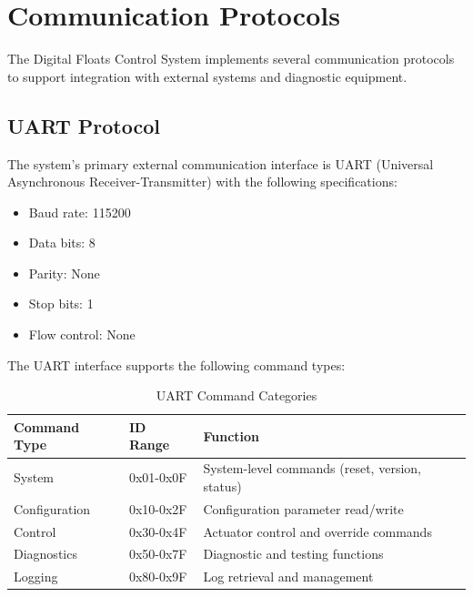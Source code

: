 \documentclass[12pt,a4paper,twoside,openright]{book}
\newcommand{\tabletextfont}{\normalfont\rmfamily}
\newcommand{\tableheadfont}{\normalfont\bfseries}
\begin{document}
\section{Communication Protocols}

The Digital Floats Control System implements several communication protocols to support integration with external systems and diagnostic equipment.

\subsection{UART Protocol}

The system's primary external communication interface is UART (Universal Asynchronous Receiver-Transmitter) with the following specifications:

\begin{itemize}
    \item Baud rate: 115200
    \item Data bits: 8
    \item Parity: None
    \item Stop bits: 1
    \item Flow control: None
\end{itemize}

The UART interface supports the following command types:

\begin{table}[h]
\centering
\setlength{\tabcolsep}{4pt} %
\begin{tabular}{|p{}|p{}|p{}|}
\hline
\tableheadfont\textbf{Command Type} & \tableheadfont\textbf{ID Range} & \tableheadfont\textbf{Function} \\
\hline
\tabletextfont System & 0x01-0x0F & System-level commands (reset, version, status) \\
\hline
\tabletextfont Configuration & 0x10-0x2F & Configuration parameter read/write \\
\hline
\tabletextfont Control & 0x30-0x4F & Actuator control and override commands \\
\hline
\tabletextfont Diagnostics & 0x50-0x7F & Diagnostic and testing functions \\
\hline
\tabletextfont Logging & 0x80-0x9F & Log retrieval and management \\
\hline
\end{tabular}
\caption{UART Command Categories}
\end{table}
\end{document}
